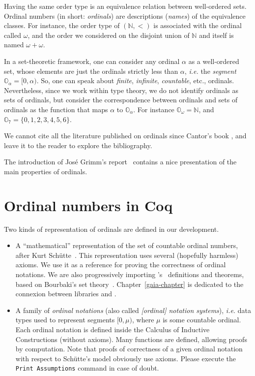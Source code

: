 Having the same order type is an equivalence relation between well-ordered sets. Ordinal numbers (in short: \emph{ordinals})  are descriptions (\emph{names}) of the equivalence classes.
For instance, the order type of $(\mathbb{N},<)$ is associated with the ordinal called  $\omega$, and the order we considered on 
the disjoint union of $\mathbb{N}$ and itself is named $\omega+\omega$.

In a set-theoretic framework, one can consider any ordinal $\alpha$ as a well-ordered set, whose  elements are just the ordinals strictly less than $\alpha$, \emph{i.e.} the \emph{segment} $\mathbb{O}_\alpha=[0, \alpha)$. So, one can speak about \emph{finite}, \emph{infinite}, \emph{countable}, etc., ordinals. Nevertheless, since we work within type theory, 
we do not identify ordinals as sets of ordinals, but consider the correspondence between ordinals and sets of ordinals as the function that maps $\alpha$ to $\mathbb{O}_\alpha$.
For instance $\mathbb{O}_\omega=\mathbb{N}$, and $\mathbb{O}_7=\{0,1,2,3,4,5,6\}$.


We cannot cite all the literature published on ordinals since Cantor's book
\cite{cantorbook}, and 
leave it to the reader to explore the bibliography.

The introduction of Jos\'e Grimm's report~\cite{grimm:hal-00911710} contains a nice presentation of the main properties of ordinals.


\section{Ordinal numbers in Coq}

Two kinds of representation of ordinals are defined in our development.

\begin{itemize}
\item A ``mathematical'' representation of the set of countable ordinal numbers, after Kurt Schütte~\cite{schutte}. This representation uses several (hopefully harmless) axioms. We use it as a reference for proving the correctness of ordinal notations.
  We are also progressively importing \gaia's~\cite{Gaia} definitions and theorems, based on Bourbaki's set theory~\cite{Grimm2016}. Chapter~\ref{gaia-chapter} is dedicated to the connexion between libraries \HydrasLib and \gaia.
  
\item A family of \emph{ordinal notations} (also called \emph{[ordinal] notation systems}), \emph{i.e.} data types used to represent segments $[0,\mu)$, where $\mu$ is some countable ordinal. Each ordinal notation is defined inside the Calculus of Inductive Constructions (without axioms). Many functions are defined, allowing proofs by computation. Note that proofs of 
correctness of a given ordinal notation with respect to Schütte's model obviously use axioms.
Please execute the \texttt{Print Assumptions} command in case of doubt.
\end{itemize}

